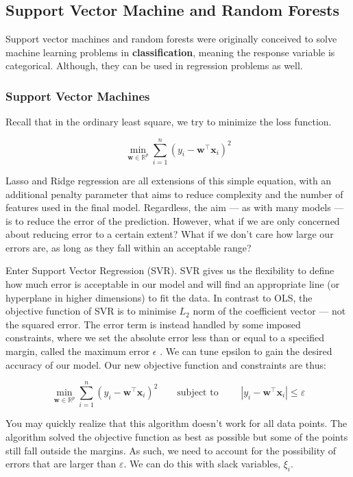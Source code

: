 \documentclass[twoside]{report}
\begin{document}
\begin{spacing}{1}
\subsection{Support Vector Machine and Random Forests}
Support vector machines and random forests were originally conceived to solve machine learning problems in \textbf{classification}, meaning the response variable is categorical. Although, they can be used in regression problems as well.

\subsubsection{Support Vector Machines}
Recall that in the ordinary least square, we try to minimize the loss function. 

\[
\min_{\boldsymbol{w} \in \mathbb{R}^{p}} \sum_{i=1}^{n}\left(y_{i}-\boldsymbol{w}^{\top} \boldsymbol{x}_{i}\right)^{2}
\]

Lasso and Ridge regression are all extensions of this simple equation, with an additional penalty parameter that aims to reduce complexity and the number of features used in the final model. Regardless, the aim — as with many models — is to reduce the error of the prediction. However, what if we are only concerned about reducing error to a certain extent? What if we don’t care how large our errors are, as long as they fall within an acceptable range? 

Enter Support Vector Regression (SVR). SVR gives us the flexibility to define how much error is acceptable in our model and will find an appropriate line (or hyperplane in higher dimensions) to fit the data. In contrast to OLS, the objective function of SVR is to minimise $L_2$ norm of the coefficient vector — not the squared error. The error term is instead handled by some imposed constraints, where we set the absolute error less than or equal to a specified margin, called the maximum error $\epsilon$ . We can tune epsilon to gain the desired accuracy of our model. Our new objective function and constraints are thus:

$$
\min _{\boldsymbol{w} \in \mathbb{R}^{p}} \sum_{i=1}^{n}\left(y_{i}-\boldsymbol{w}^{\top} \boldsymbol{x}_i\right)^{2} \quad \quad \text{subject to } \quad \quad\left|y_{i}-\boldsymbol{w}^{\top} \boldsymbol{x}_i\right| \leq \varepsilon
$$

You may quickly realize that this algorithm doesn’t work for all data points. The algorithm solved the objective function as best as possible but some of the points still fall outside the margins. As such, we need to account for the possibility of errors that are larger than $\varepsilon$. We can do this with slack variables, $\xi_i$.


\end{spacing}
\end{document}
